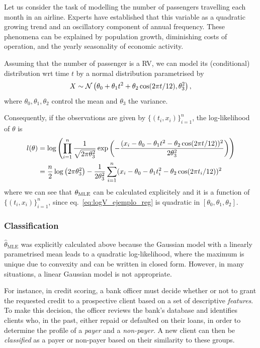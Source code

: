 Let us consider the task of modelling the number of passengers travelling each month in an airline. Experts have established that this variable as a quadratic growing trend and an oscillatory component of annual frequency. These phenomena can be explained by population growth, diminishing costs of operation, and the yearly seasonality of economic activity. 

Assuming that the number of passenger is a RV, we can model its (conditional) distribution wrt time $t$ by a normal distribution parametrised by 
\begin{equation}
	X \sim {\mathcal N}\left(\theta_0 + \theta_1 t^2 + \theta_2\cos(2\pi t/12), \theta_3^2\right),
\end{equation}
where $\theta_0,\theta_1,\theta_2$ control the mean and $\theta_3$ the variance. 

Consequently, if the observations are given by $\{(t_i,x_i)\}_{i=1}^n$, the log-likelihood of $\theta$ is
\begin{align}
	\label{eq:logV_ejemplo_reg}
	l(\theta) 	&=\log\left(\prod_{i=1}^n \frac{1}{\sqrt{2\pi\theta_3^2}}\exp\left(-\frac{(x_i-\theta_0 - \theta_1 t^2 - \theta_2\cos(2\pi t/12))^2}{2\theta_3^2}\right)\right)\nonumber \\
	&=\frac{n}{2}\log\left(2\pi\theta_3^2\right)  - \frac{1}{2\theta_3^2}\sum_{i=1}^n (x_i - \theta_0 - \theta_1 t_i^2 - \theta_2\cos(2\pi t_i/12))^2
\end{align}
where we can see that ${\theta_\text{MLE}}$ can be calculated explicitely and it is a function of  $\{(t_i,x_i)\}_{i=1}^n$, since eq.~\eqref{eq:logV_ejemplo_reg} is quadratic in $[\theta_0,\theta_1,	\theta_2]$.




\subsubsection{Classification} 
\label{sub:clasif}

$\hat{\theta}_{\mathrm{MLE}}$ was explicitly calculated above because the Gaussian model with a linearly parametrised mean leads to a quadratic log-likelihood, where the maximum is unique due to convexity and can be written in closed form. However, in many situations, a linear Gaussian model is not appropriate.

For instance, in credit scoring, a bank officer must decide whether or not to grant the requested credit to a prospective client based on a set of descriptive \emph{features}. To make this decision, the officer reviews the bank’s database and identifies clients who, in the past, either repaid or defaulted on their loans, in order to determine the profile of a \emph{payer} and a \emph{non-payer}. A new client can then be \emph{classified} as a payer or non-payer based on their similarity to these groups.

